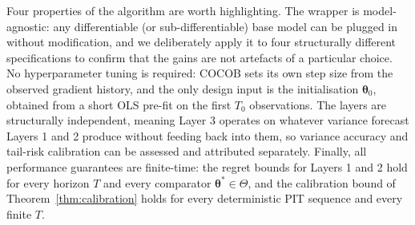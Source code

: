 Four properties of the algorithm are worth highlighting. The wrapper is model-agnostic: any differentiable (or sub-differentiable) base model can be plugged in without modification, and we deliberately apply it to four structurally different specifications to confirm that the gains are not artefacts of a particular choice. No hyperparameter tuning is required: COCOB sets its own step size from the observed gradient history, and the only design input is the initialisation $\boldsymbol{\theta}_0$, obtained from a short OLS pre-fit on the first $T_0$ observations. The layers are structurally independent, meaning Layer 3 operates on whatever variance forecast Layers 1 and 2 produce without feeding back into them, so variance accuracy and tail-risk calibration can be assessed and attributed separately. Finally, all performance guarantees are finite-time: the regret bounds for Layers 1 and 2 hold for every horizon $T$ and every comparator $\boldsymbol{\theta}^* \in \Theta$, and the calibration bound of Theorem~\ref{thm:calibration} holds for every deterministic PIT sequence and every finite $T$.
